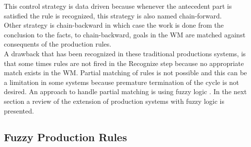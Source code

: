 This control strategy is data driven because whenever the antecedent
part is satisfied the rule is recognized, this strategy is also named
chain-forward. \\Other strategy is chain-backward in which case the work
is done from the conclusion to the facts, to chain-backward, goals in
the WM are matched against consequents of the production
rules.\\A drawback that has been recognized in these traditional
productions systems, is that some times rules are not fired in the
Recognize step because no appropriate match exists in the WM. Partial
matching of rules is not possible and this can be a limitation in some
systems because premature termination of the cycle is not desired. An
approach to handle partial matching is using fuzzy logic
 \cite{konar2006computational}. In the next section a review of the
extension of production systems with fuzzy logic is presented.

\subsection{Fuzzy Production Rules}

